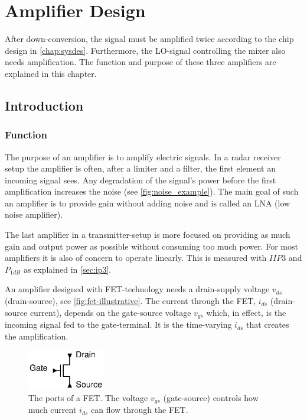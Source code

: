 \chapter{Amplifier Design}\label{ch:amp}

	After down-conversion, the signal must be amplified twice according to the chip design in \autoref{chap:sysdes}. Furthermore, the LO-signal controlling the mixer also needs amplification. The function and purpose of these three amplifiers are explained in this chapter.

	\section{Introduction}
		\subsection{Function}
			The purpose of an amplifier is to amplify electric signals. In a radar receiver setup the amplifier is often, after a limiter and a filter, the first element an incoming signal sees. Any degradation of the signal's power before the first amplification increases the noise (see \autoref{fig:noise_example}). The main goal of such an amplifier is to provide gain without adding noise and is called an LNA (low noise amplifier).

			The last amplifier in a transmitter-setup is more focused on providing as much gain and output power as possible without consuming too much power. For most amplifiers it is also of concern to operate linearly. This is measured with $IIP3$ and $P_{1dB}$ as explained in \autoref{sec:ip3}.

			An amplifier designed with FET-technology needs a drain-supply voltage $v_{ds}$ (drain-source), see \autoref{fig:fet-illustrative}. The current through the FET, $i_{ds}$ (drain-source current), depends on the gate-source voltage $v_{gs}$ which, in effect, is the incoming signal fed to the gate-terminal. It is the time-varying $i_{ds}$ that creates the amplification.

		\begin{figure}[hbt!]
			\centering
			\includegraphics[width=0.3\textwidth]{fig/amplifiers/fet-illustrative}
			\caption[The ports of a FET.]{The ports of a FET. The voltage $v_{gs}$ (gate-source) controls how much current $i_{ds}$ can flow through the FET.}\label{fig:fet-illustrative}
		\end{figure}


